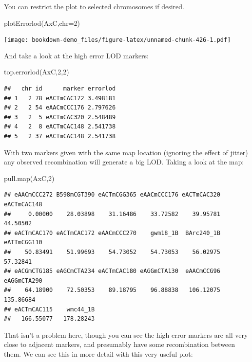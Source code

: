 \documentclass[
]{book}
\newenvironment{Shaded}{\begin{snugshade}}{\end{snugshade}}
\newcommand{\AttributeTok}[1]{\textcolor[rgb]{0.77,0.63,0.00}{#1}}
\newcommand{\DecValTok}[1]{\textcolor[rgb]{0.00,0.00,0.81}{#1}}
\newcommand{\FunctionTok}[1]{\textcolor[rgb]{0.00,0.00,0.00}{#1}}
\newcommand{\NormalTok}[1]{#1}
\begin{document}
You can restrict the plot to selected chromosomes if desired.

\begin{Shaded}
\begin{Highlighting}[]
\FunctionTok{plotErrorlod}\NormalTok{(AxC,}\AttributeTok{chr=}\DecValTok{2}\NormalTok{) }
\end{Highlighting}
\end{Shaded}

\texttt{[image: bookdown-demo\_files/figure-latex/unnamed-chunk-426-1.pdf]}

And take a look at the high error LOD markers:

\begin{Shaded}
\begin{Highlighting}[]
\FunctionTok{top.errorlod}\NormalTok{(AxC,}\DecValTok{2}\NormalTok{,}\DecValTok{2}\NormalTok{)}
\end{Highlighting}
\end{Shaded}

\begin{verbatim}
##   chr id      marker errorlod
## 1   2 78 eACTmCAC172 3.498181
## 2   2 54 eAACmCCC176 2.797626
## 3   2  5 eACTmCAC320 2.548489
## 4   2  8 eACTmCAC148 2.541738
## 5   2 37 eACTmCAC148 2.541738
\end{verbatim}

With two markers given with the same map location (ignoring the effect of jitter) any observed recombination will generate a big LOD. Taking a look at the map:

\begin{Shaded}
\begin{Highlighting}[]
\FunctionTok{pull.map}\NormalTok{(AxC,}\DecValTok{2}\NormalTok{) }
\end{Highlighting}
\end{Shaded}

\begin{verbatim}
## eAACmCCC272 B598mCGT390 eACTmCGG365 eAACmCCC176 eACTmCAC320 eACTmCAC148 
##     0.00000    28.03898    31.16486    33.72582    39.95781    44.50502 
## eACTmCAC170 eACTmCAC172 eAACmCCC270    gwm18_1B  BArc240_1B eATTmCGG110 
##    50.83491    51.99693    54.73052    54.73053    56.02975    57.32841 
## eACGmCTG185 eAGCmCTA234 eACTmCAC180 eAGGmCTA130  eAACmCCG96 eAGGmCTA290 
##    64.18900    72.50353    89.18795    96.88838   106.12075   135.86684 
## eACTmCAC115    wmc44_1B 
##   166.55077   178.28243
\end{verbatim}

That isn't a problem here, though you can see the high error markers are all very close to adjacent markers, and presumably have some recombination between them. We can see this in more detail with this very useful plot:
\end{document}
